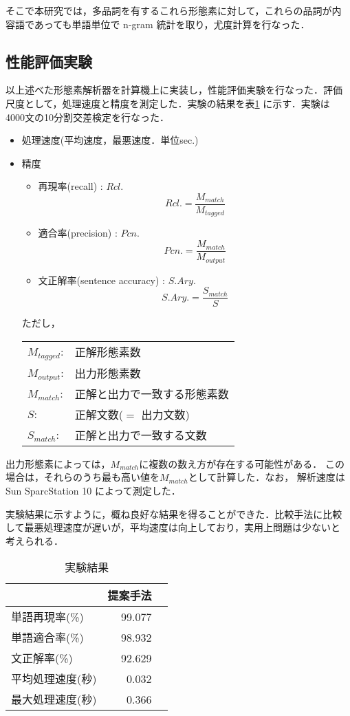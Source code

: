 そこで本研究では，多品詞を有するこれら形態素に対して，これらの品詞が内
容語であっても単語単位で n-gram 統計を取り，尤度計算を行なった．



\subsection{性能評価実験}

以上述べた形態素解析器を計算機上に実装し，性能評価実験を行なった．評価
尺度として，処理速度と精度を測定した．実験の結果を表{}\ref{表:実験結果}
に示す．実験は 4000文の10分割交差検定を行なった．

\begin{itemize}
\item 処理速度(平均速度，最悪速度．単位sec.)
\item 精度
\begin{itemize}
\item 再現率(recall) : $Rcl.$
\[ Rcl. = \frac{M_{match}}{M_{tagged}} \]
\item 適合率(precision) : $Pcn.$
\[ Pcn. = \frac{M_{match}}{M_{output}} \]
\item 文正解率(sentence accuracy) : $S.Ary.$
\[ S.Ary. = \frac{S_{match}}{S} \]
\end{itemize}

ただし，

\begin{tabular}{ll}
$M_{tagged}$:   &   正解形態素数 \\
$M_{output}$:   &   出力形態素数 \\
$M_{match}$:    &   正解と出力で一致する形態素数 \\
$S$:            &   正解文数($=$ 出力文数) \\
$S_{match}$:    &   正解と出力で一致する文数 \\
\end{tabular}
\end{itemize}

出力形態素によっては，$M_{match}$に複数の数え方が存在する可能性がある．
この場合は，それらのうち最も高い値を$M_{match}$として計算した．なお，
解析速度は Sun SparcStation 10 によって測定した．

実験結果に示すように，概ね良好な結果を得ることができた．比較手法に比較
して最悪処理速度が遅いが，平均速度は向上しており，実用上問題は少ないと
考えられる．

\begin{table}
\begin{center}
\caption{実験結果}
\label{表:実験結果}
\begin{tabular}{lrr}
\hline\hline
                 & 提案手法 \\
\hline
単語再現率(\%)   &   99.077 \\
単語適合率(\%)   &   98.932 \\
文正解率(\%)     &   92.629 \\
\hline
平均処理速度(秒) &    0.032 \\
最大処理速度(秒) &    0.366 \\
\hline
\end{tabular}
\end{center}
\end{table}


